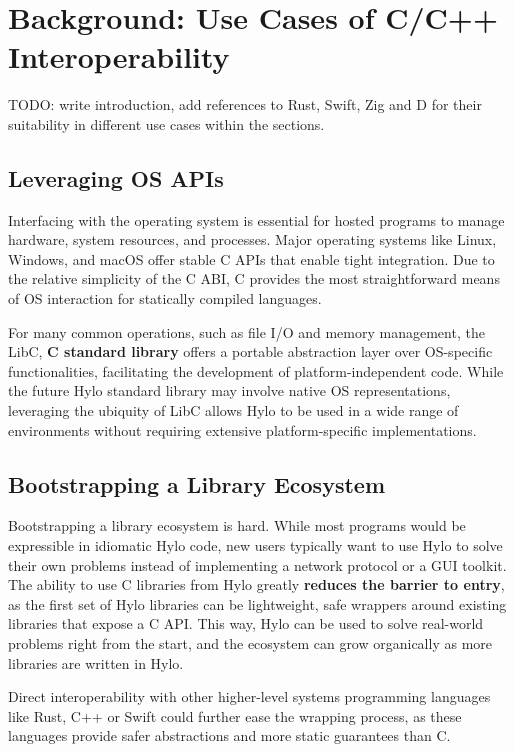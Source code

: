 \section {Background: Use Cases of C/C++ Interoperability}
\label{sec:use_cases_of_interop}
TODO: write introduction, add references to Rust, Swift, Zig and D for their suitability in different use cases within the sections.

\subsection{Leveraging OS APIs}

Interfacing with the operating system is essential for hosted programs to manage hardware, system resources, and processes. Major operating systems like Linux, Windows, and macOS offer stable C APIs that enable tight integration. Due to the relative simplicity of the C ABI, C provides the most straightforward means of OS interaction for statically compiled languages.

For many common operations, such as file I/O and memory management, the LibC, \textbf{C standard library} \cite{libc} offers a portable abstraction layer over OS-specific functionalities, facilitating the development of platform-independent code. While the future Hylo standard library may involve native OS representations, leveraging the ubiquity of LibC allows Hylo to be used in a wide range of environments without requiring extensive platform-specific implementations.

\subsection{Bootstrapping a Library Ecosystem}
Bootstrapping a library ecosystem is hard. While most programs would be expressible in idiomatic Hylo code, new users typically want to use Hylo to solve their own problems instead of implementing a network protocol or a GUI toolkit. The ability to use C libraries from Hylo greatly \textbf{reduces the barrier to entry}, as the first set of Hylo libraries can be lightweight, safe wrappers around existing libraries that expose a C API. This way, Hylo can be used to solve real-world problems right from the start, and the ecosystem can grow organically as more libraries are written in Hylo.

Direct interoperability with other higher-level systems programming languages like Rust, C++ or Swift could further ease the wrapping process, as these languages provide safer abstractions and more static guarantees than C.

